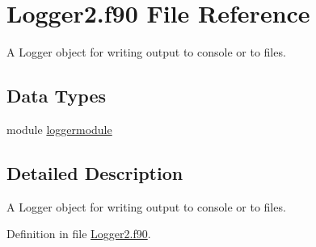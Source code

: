 \hypertarget{_logger2_8f90}{\section{Logger2.\+f90 File Reference}
\label{_logger2_8f90}
}


A Logger object for writing output to console or to files.  


\subsection*{Data Types}
\begin{DoxyCompactItemize}
\item 
module \hyperlink{classloggermodule}{loggermodule}
\end{DoxyCompactItemize}


\subsection{Detailed Description}
A Logger object for writing output to console or to files. 



Definition in file \hyperlink{_logger2_8f90_source}{Logger2.\+f90}.

